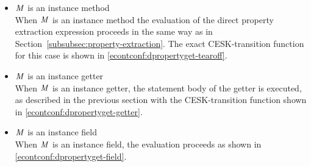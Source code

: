\documentclass[a4paper,oneside]{article}
\begin{document}
\begin{itemize}
    \item $\mathit{M}$ is an instance method\\
        When $\mathit{M}$ is an instance method the evaluation of the direct property extraction expression proceeds in the same way as in Section~\ref{subsubsec:property-extraction}.
        The exact CESK-transition function for this case is shown in \eqref{econtconf:dpropertyget-tearoff}.

    \item $\mathit{M}$ is an instance getter\\
        When $\mathit{M}$ is an instance getter, the statement body of the getter is executed, as described in the previous section with the CESK-transition function shown in \eqref{econtconf:dpropertyget-getter}.

    \item $\mathit{M}$ is an instance field\\
        When $\mathit{M}$ is an instance field, the evaluation proceeds as shown in \eqref{econtconf:dpropertyget-field}.

\end{itemize}
\end{document}
